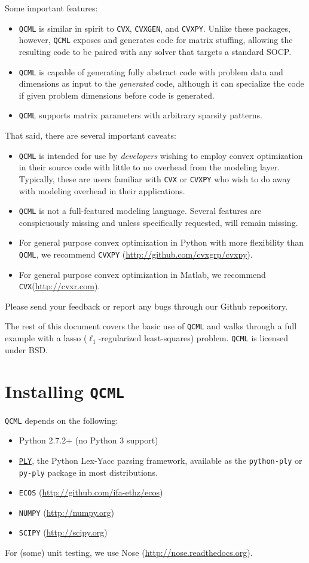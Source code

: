 \documentclass[11pt]{article}
\def\qcml{\texttt{QCML}\xspace}
\def\cvxpy{\texttt{CVXPY}\xspace}
\def\cvx{\texttt{CVX}\xspace}
\def\cvxgen{\texttt{CVXGEN}\xspace}
\begin{document}
Some important features:
\begin{itemize}
\item \qcml is similar in spirit to \cvx, \cvxgen, and 
\cvxpy. Unlike these packages, however, \qcml exposes and generates code
for matrix stuffing, allowing the resulting code to be paired with any solver
that targets a standard SOCP.
\item \qcml is capable of generating fully abstract code with problem data and
dimensions as input to the \emph{generated} code, although it can specialize
the code if given problem dimensions before code is generated.
\item \qcml supports matrix parameters with arbitrary sparsity patterns.
\end{itemize}
That said, there are several important caveats:
\begin{itemize}
\item \qcml is intended for use by \emph{developers} wishing to employ convex
optimization in their source code with little to no overhead from the modeling 
layer. Typically, these are users familiar with \cvx or \cvxpy who wish to
do away with modeling overhead in their applications.
\item \qcml is not a full-featured modeling language. Several features are
conspicuously missing and unless specifically requested, will remain missing.
\item For general purpose convex optimization in Python with more flexibility
than \qcml, we recommend \cvxpy 
(\url{http://github.com/cvxgrp/cvxpy}).
\item For general purpose convex optimization in Matlab, we recommend 
\cvx (\url{http://cvxr.com}).
\end{itemize}
Please send your feedback or report any bugs through our Github repository.

The rest of this document covers the basic use of \qcml and walks through a
full example with a lasso ($\ell_1$-regularized least-squares) problem. 
\qcml is licensed under BSD.

\newpage
\tableofcontents
\newpage

\section{Installing \qcml}
\qcml depends on the following:
\begin{itemize} 
\item Python 2.7.2+ (no Python 3 support)
\item \href{http://www.dabeaz.com/ply/}{\tt PLY}, the Python Lex-Yacc parsing framework,
  available as the {\tt python-ply} or {\tt py-ply} package in most distributions.
\item {\tt ECOS} (\url{http://github.com/ifa-ethz/ecos})
\item {\tt NUMPY} (\url{http://numpy.org})
\item {\tt SCIPY} (\url{http://scipy.org})
\end{itemize}
For (some) unit testing, we use Nose (\url{http://nose.readthedocs.org}).
\end{document}
